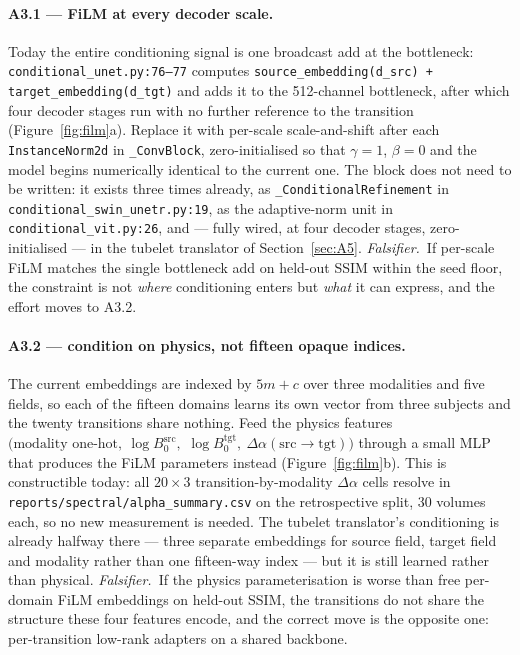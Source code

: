 \documentclass[11pt,a4paper]{article}
\newcommand{\fals}{\textit{Falsifier.}\ }
\begin{document}
\paragraph{A3.1 --- FiLM at every decoder scale.} Today the entire conditioning signal is one broadcast
add at the bottleneck: \texttt{conditional\_unet.py:76--77} computes
\texttt{source\_embedding(d\_src) + target\_embedding(d\_tgt)} and adds it to the \num{512}-channel
bottleneck, after which four decoder stages run with no further reference to the transition
(Figure~\ref{fig:film}a). Replace it with per-scale scale-and-shift after each \texttt{InstanceNorm2d} in
\texttt{\_ConvBlock}, zero-initialised so that $\gamma = 1$, $\beta = 0$ and the model begins numerically
identical to the current one. The block does not need to be written: it exists three times already, as
\texttt{\_ConditionalRefinement} in \texttt{conditional\_swin\_unetr.py:19}, as the adaptive-norm unit in
\texttt{conditional\_vit.py:26}, and --- fully wired, at four decoder stages, zero-initialised --- in the
tubelet translator of Section~\ref{sec:A5}.
\fals If per-scale FiLM matches the single bottleneck add on held-out SSIM within the seed floor, the
constraint is not \emph{where} conditioning enters but \emph{what} it can express, and the effort moves
to A3.2.

\paragraph{A3.2 --- condition on physics, not fifteen opaque indices.} The current embeddings are indexed
by $5m + c$ over three modalities and five fields, so each of the fifteen domains learns its own vector
from three subjects and the twenty transitions share nothing. Feed the physics features
$\big(\text{modality one-hot},\ \log B_0^{\mathrm{src}},$
$\log B_0^{\mathrm{tgt}},\ \Delta\alpha(\mathrm{src}\!\to\!\mathrm{tgt})\big)$ through a small MLP that
produces the FiLM parameters instead (Figure~\ref{fig:film}b). This is constructible today: all
$20 \times 3$ transition-by-modality $\Delta\alpha$ cells resolve in
\texttt{reports/spectral/alpha\_summary.csv} on the retrospective split, 30 volumes each, so no new
measurement is needed. The tubelet translator's conditioning is already halfway there --- three separate
embeddings for source field, target field and modality rather than one fifteen-way index --- but it is
still learned rather than physical.
\fals If the physics parameterisation is worse than free per-domain FiLM embeddings on held-out SSIM, the
transitions do not share the structure these four features encode, and the correct move is the opposite
one: per-transition low-rank adapters on a shared backbone.
\end{document}
